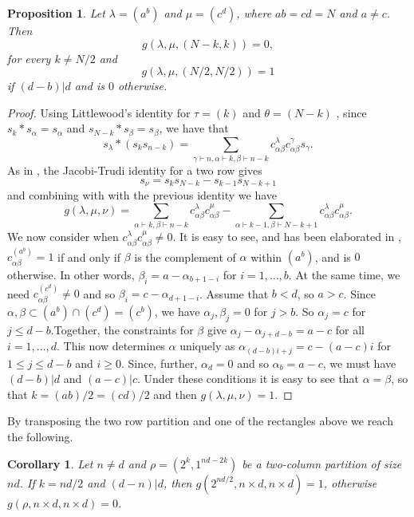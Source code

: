 \documentclass{article}
\numberwithin{equation}{section}
\newtheorem{proposition}[equation]{Proposition}
\newtheorem{corollary}[equation]{Corollary}
\theoremstyle{definition}
\begin{document}
\begin{proposition}
Let $\lambda=(a^b)$ and $\mu=(c^d)$, where $ab=cd=N$ and $a\neq c$. 
Then
$$g(\lambda,\mu,(N-k,k))=0,$$
for every $k\neq N/2$ and 
$$g(\lambda,\mu,(N/2,N/2)) =1$$
if  $(d-b) | d$ and is $0$ otherwise. 
\end{proposition}
\begin{proof}
Using Littlewood's identity for $\tau = (k)$ and $\theta =(N-k)$ , since $s_k * s_{\alpha}=s_{\alpha}$ and $s_{N-k}*s_{\beta}=s_{\beta}$, we have that
$$s_{\lambda}*(s_k s_{n-k})=\sum_{\gamma \vdash n, \alpha\vdash k, \beta \vdash n-k} c^{\lambda}_{\alpha\beta} c^{\gamma}_{\alpha\beta}s_{\gamma}.$$
As in \cite{pp:14}, the Jacobi-Trudi identity for a two row gives 
$$s_{\nu}=s_ks_{N-k}-s_{k-1}s_{N-k+1}$$
and combining with with the previous identity we have
$$g(\lambda,\mu,\nu)= \sum_{\alpha\vdash k,\beta \vdash n-k} c^{\lambda}_{\alpha\beta}c^{\mu}_{\alpha\beta} - 
\sum_{\alpha\vdash k-1,\beta \vdash N-k+1} c^{\lambda}_{\alpha\beta}c^{\mu}_{\alpha\beta} .$$
We now consider when $c^{\lambda}_{\alpha\beta}c^{\mu}_{\alpha\beta} \neq 0$. It is easy to see, and has been elaborated in \cite{pp:14}, $c^{(a^b)}_{\alpha\beta}=1$ if and only if $\beta$ is the complement of $\alpha$ within $(a^b)$, and is $0$ otherwise. In other words, $\beta_i = a - \alpha_{b+1-i}$ for $i=1,\ldots,b$. At the same time, we need $c^{(c^d)}_{\alpha\beta}\neq 0$ and so $\beta_i = c-\alpha_{d+1-i}$. Assume that $b<d$, so $a>c$.  Since $\alpha,\beta \subset (a^b) \cap (c^d) = (c^b)$, we have $\alpha_j,\beta_j=0$ for $j>b$. So $\alpha_{j}=c$ for $j \leq d-b$.Together, the constraints for $\beta$ give $\alpha_{j} -\alpha_{j+d-b} = a-c$ for all $i=1,\ldots,d$. This now determines $\alpha$ uniquely as $\alpha_{(d-b)i+j} = c- (a-c)i$ for $1 \leq j\leq d-b$ and $i\geq 0$. Since, further, $\alpha_d=0$ and so $\alpha_b=a-c$, we must have $(d-b)|d$ and $(a-c)|c$. Under these conditions it is easy to see that $\alpha=\beta$, so that $k= (ab)/2=(cd)/2$ and then $g(\lambda,\mu,\nu)=1$.
\end{proof}

By transposing the two row partition and one of the rectangles above we reach the following. 
\begin{corollary}\label{cor:kron_even}
Let $n \neq d$ and $\rho = (2^k,1^{nd-2k})$ be a two-column partition of size $nd$. 
If $k=nd/2$ and $(d-n) | d $, then $g( 2^{nd/2}, n \times d, n \times d)=1$, otherwise
$g(\rho, n \times d, n \times d )=0$.
\end{corollary}
\end{document}
